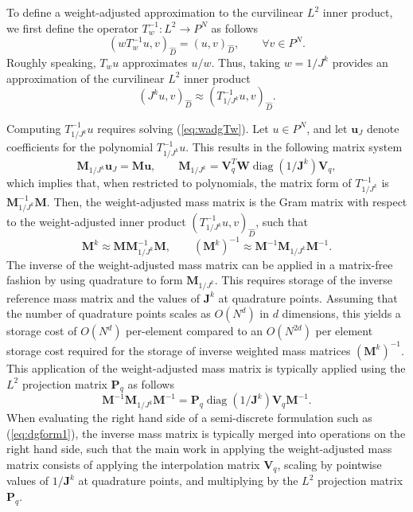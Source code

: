 \documentclass[preprint,10pt]{article}
\theoremstyle{definition}
\theoremstyle{lemma}
\theoremstyle{theorem}
\theoremstyle{assumption}
\DeclareMathOperator{\diag}{diag}
\renewcommand{\hat}{\widehat}
\newcommand{\LRp}[1]{\left( #1 \right)}
\begin{document}
{To define a weight-adjusted approximation to the curvilinear $L^2$ inner product, we first define the operator $T_{w}^{-1}: L^2\rightarrow P^N$ as follows
\begin{equation}
\LRp{wT_{w}^{-1} u,v}_{\hat{D}} = \LRp{ u,v}_{\hat{D}}, \qquad \forall v\in P^N.
\label{eq:wadgTw}
\end{equation}
Roughly speaking, $T_{w} u$ approximates $u/w$.  Thus, taking $w = 1/J^k$ provides an approximation of the curvilinear $L^2$ inner product
\begin{equation*}
\LRp{J^k u,v}_{\hat{D}} \approx \LRp{T_{1/J^k}^{-1} u,v}_{\hat{D}}.
\end{equation*}

Computing $T_{1/J^k}^{-1}u$ requires solving (\ref{eq:wadgTw}).  Let $u \in P^N$, and let $\bm{u}_J$ denote coefficients for the polynomial $T_{1/J^k}^{-1}u$.  This results in the following matrix system
\[
\bm{M}_{1/J^k}\bm{u}_{J} = \bm{M}\bm{u}, \qquad {\bm{M}_{1/J^k}} = \bm{V}_q^T \bm{W}\diag\LRp{1/\bm{J}^k}\bm{V}_q,%
\]
which implies that, when restricted to polynomials, the matrix form of $T_{1/J^k}^{-1}$ is $\bm{M}_{1/J^k}^{-1}\bm{M}$.  Then, the weight-adjusted mass matrix is the Gram matrix with respect to the weight-adjusted inner product $\LRp{T_{1/J^k}^{-1} u,v}_{\hat{D}}$, such that
\[
\bm{M}^k \approx \bm{M}\bm{M}_{1/J^k}^{-1}\bm{M}, \qquad \LRp{\bm{M}^k}^{-1} \approx \bm{M}^{-1}\bm{M}_{1/J^k}\bm{M}^{-1}.
\]
The inverse of the weight-adjusted mass matrix can be applied in a matrix-free fashion by using quadrature to form $\bm{M}_{1/J^k} $.  This requires storage of the inverse reference mass matrix and the values of $\bm{J}^k$ at quadrature points.  Assuming that the number of quadrature points scales as $O(N^d)$ in $d$ dimensions, this yields a storage cost of $O(N^d)$ per-element compared to an $O(N^{2d})$ per element storage cost required for the storage of inverse weighted mass matrices $\LRp{\bm{M}^k}^{-1}$.  This application of the weight-adjusted mass matrix is typically applied using the $L^2$ projection matrix $\bm{P}_q$ as follows
\[
\bm{M}^{-1}\bm{M}_{1/J^k}\bm{M}^{-1} = \bm{P}_q \diag\LRp{1/\bm{J}^k} \bm{V}_q \bm{M}^{-1}.
\]
When evaluating the right hand side of a semi-discrete formulation such as (\ref{eq:dgform1}), the inverse mass matrix is typically merged into operations on the right hand side, such that the main work in applying the weight-adjusted mass matrix consists of applying the interpolation matrix $\bm{V}_q$, scaling by pointwise values of $1/\bm{J}^k$ at quadrature points, and multiplying by the $L^2$ projection matrix $\bm{P}_q$.


}
\end{document}
